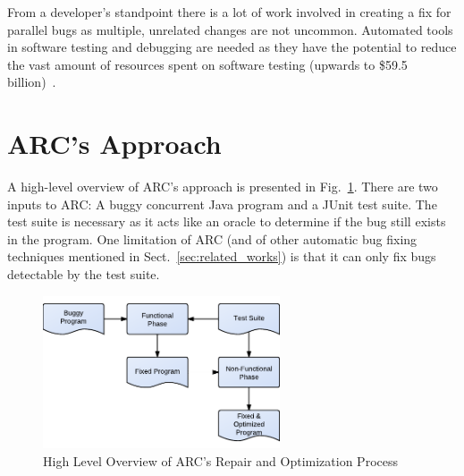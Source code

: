 \documentclass{llncs}
\begin{document}
From a developer's standpoint there is a lot of work involved in creating a fix
for parallel bugs as multiple, unrelated changes are not uncommon.
Automated tools in software testing and debugging are needed as they have the
potential to reduce the vast amount of resources spent on software testing
(upwards to \$59.5 billion)~\cite{RTI02}.

\section{ARC's Approach}
\label{sec:approach}

A high-level overview of ARC's approach is
presented in Fig.~\ref{fig:process}. There are two inputs to ARC: A buggy
concurrent Java program and a JUnit test suite. The test suite is necessary as
it acts like an oracle to determine if the bug still exists in the program. One
limitation of ARC (and of other automatic bug fixing techniques mentioned in
Sect.~\ref{sec:related_works}) is that it can only fix bugs detectable by the
test suite.

\begin{figure}[h]
  \centering
  \includegraphics[width=7.0cm]{figures/process.pdf}
  \caption{High Level Overview of ARC's Repair and Optimization Process}
  \label{fig:process}
\end{figure}

\end{document}

